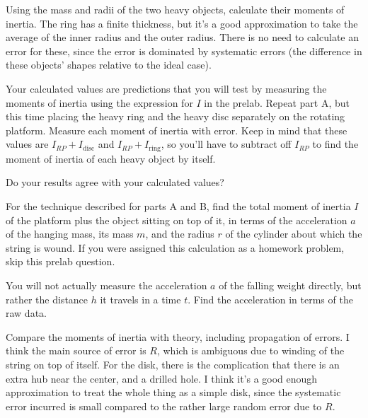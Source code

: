 
Using the mass and radii of the two heavy objects, calculate their
moments of inertia. The ring has a finite thickness, but it's a good
approximation to take the average of the inner radius and the outer
radius. There is no need to calculate an error for these, since the
error is dominated by systematic errors (the difference in these
objects' shapes relative to the ideal case). 

Your calculated values are predictions that you will test by measuring
the moments of inertia using the expression for $I$ in the
prelab. Repeat part A, but this time placing the heavy ring and
the heavy disc separately on the rotating platform. Measure each
moment of inertia with error. Keep in mind that these values are
$I_{RP} + I_\text{disc}$ and $I_{RP} + I_\text{ring}$, so you'll have
to subtract off $I_{RP}$ to find the moment of inertia of each heavy
object by itself. 

Do your results agree with your calculated values?

\prelab

\prelabquestion For the technique described for parts A and B, 
find the total moment of inertia
$I$ of the platform plus the object sitting on top of it, in terms
of the acceleration $a$ of the hanging mass, its mass $m$, and the radius
$r$ of the cylinder about which the string is wound. If you were assigned
this calculation as a homework problem, skip this prelab question.

\prelabquestion You will not actually measure the acceleration $a$
of the falling weight directly, but rather the distance $h$ it travels
in a time $t$. Find the acceleration in terms of the raw data.

\analysis

Compare the moments of inertia with theory, including propagation of
errors. I think the main source of error is $R$, which is ambiguous due
to winding of the string on top of itself. For the disk, there is the
complication that there is an extra hub near the center, and a drilled
hole. I think it's a good enough approximation to treat the whole thing
as a simple disk, since the systematic error incurred is small compared
to the rather large random error due to $R$.

